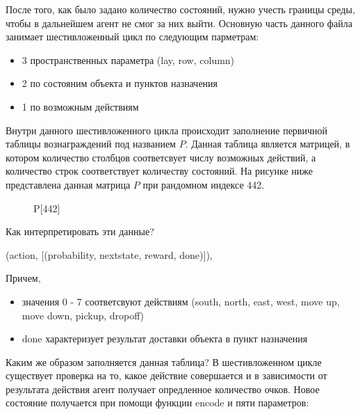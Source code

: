 \documentclass[a4paper]{report}
\theoremstyle{definition}
\theoremstyle{plain}
\theoremstyle{remark}
\theoremstyle{remark}
\theoremstyle{definition}
\begin{document}
После того, как было задано количество состояний, нужно учесть границы среды, чтобы в дальнейшем агент не смог за них выйти. Основную часть данного файла занимает шестивложенный цикл по следующим парметрам:
\begin{itemize}
    \item 3 пространственных параметра (lay, row, column)
    \item 2 по состояним объекта и пунктов назначения
    \item 1 по возможным действиям 
\end{itemize}
Внутри данного шестивложенного цикла происходит заполнение первичной таблицы вознаграждений под названием $P$. Данная таблица является матрицей, в котором количество столбцов соответсвует числу возможных действий, а количество строк соответствует количеству состояний. На рисунке ниже представлена данная матрица $P$ при рандомном индексе 442.
\begin{figure}[H]
	\caption{P[442]}
\end{figure}
Как интерпретировать эти данные?
\begin{center}
    (action, [(probability, nextstate, reward, done)]),
\end{center}
Причем, 
\begin{itemize}
    \item значения 0 - 7 соответсвуют действиям (south, north, east, west, move up, move down, pickup, dropoff)
    \item done характеризует результат доставки объекта в пункт назначения
\end{itemize}
Каким же образом заполняется данная таблица? В шестивложенном цикле существует проверка на то, какое действие совершается и в зависимости от результата действия агент получает опредленное количество очков. Новое состояние получается при помощи функции encode и пяти параметров:
\end{document}
